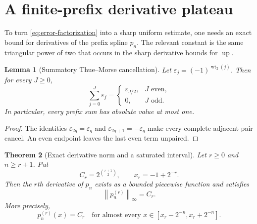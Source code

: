 \documentclass[11pt,oneside]{article}
\newtheorem{theorem}{Theorem}[section]
\newtheorem{lemma}[theorem]{Lemma}
\theoremstyle{definition}
\theoremstyle{remark}
\newcommand{\Up}{\operatorname{up}}
\newcommand{\wt}{\operatorname{wt}_2}
\newcommand{\eps}{\varepsilon}
\newcommand{\norm}[1]{\left\lVert #1\right\rVert}
\begin{document}
\section{A finite-prefix derivative plateau}
\label{sec:prefix-derivatives}

To turn \eqref{eq:error-factorization} into a sharp uniform estimate, one needs an exact bound
for derivatives of the prefix spline $p_n$.  The relevant constant is the same triangular
power of two that occurs in the sharp derivative bounds for $\Up$.

\begin{lemma}[Summatory Thue--Morse cancellation]
\label{lem:TM-prefix}
Let $\eps_j=(-1)^{\wt(j)}$.  Then for every $J\ge0$,
\begin{equation}
 \sum_{j=0}^{J}\eps_j=
 \begin{cases}
  \eps_{J/2},&J\text{ even},\\
  0,&J\text{ odd}.
 \end{cases}                                                \label{eq:TM-prefix}
\end{equation}
In particular, every prefix sum has absolute value at most one.
\end{lemma}

\begin{proof}
The identities $\eps_{2q}=\eps_q$ and $\eps_{2q+1}=-\eps_q$ make every complete adjacent pair
cancel.  An even endpoint leaves the last even term unpaired.
\end{proof}

\begin{theorem}[Exact derivative norm and a saturated interval]
\label{thm:prefix-plateau}
Let $r\ge0$ and $n\ge r+1$.  Put
\begin{equation}
 C_r=2^{\binom{r+1}{2}},
 \qquad
 x_r=-1+2^{-r}.                                             \label{eq:Cr-xr}
\end{equation}
Then the $r$th derivative of $p_n$ exists as a bounded piecewise function and satisfies
\begin{equation}
 \norm{p_n^{(r)}}_\infty=C_r.                              \label{eq:pn-derivative-norm}
\end{equation}
More precisely,
\begin{equation}
 p_n^{(r)}(x)=C_r
 \quad\text{for almost every }x\in[x_r-2^{-n},x_r+2^{-n}]. \label{eq:pn-plateau}
\end{equation}
\end{theorem}
\end{document}
